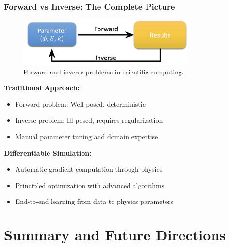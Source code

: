 \documentclass[notes]{beamer}
\begin{document}
\begin{frame}
\frametitle{Forward vs Inverse: The Complete Picture}

\begin{figure}[ht]
	\centering
	\includegraphics[width=0.8\textwidth]{figs/forward-inverse.png}
	\caption*{Forward and inverse problems in scientific computing.}
\end{figure}

\textbf{Traditional Approach:}
\begin{itemize}
    \item Forward problem: Well-posed, deterministic
    \item Inverse problem: Ill-posed, requires regularization
    \item Manual parameter tuning and domain expertise
\end{itemize}

\textbf{Differentiable Simulation:}
\begin{itemize}
    \item Automatic gradient computation through physics
    \item Principled optimization with advanced algorithms
    \item End-to-end learning from data to physics parameters
\end{itemize}

\end{frame}

\section{Summary and Future Directions}
\end{document}
